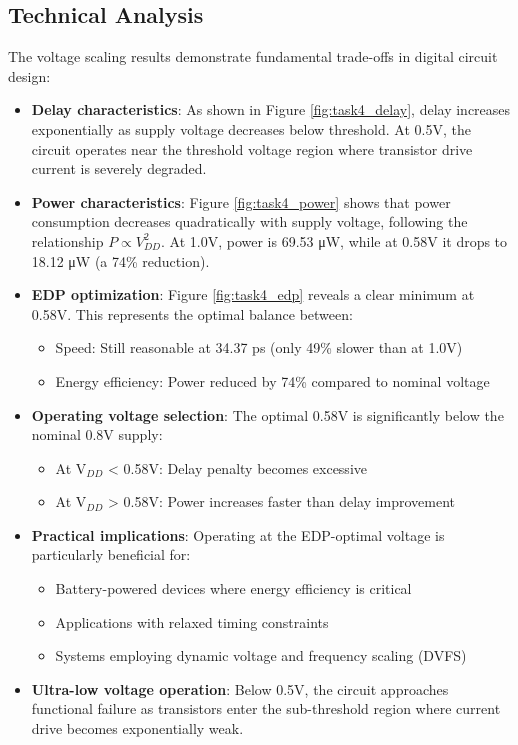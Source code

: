 \documentclass[UTF8,12pt,a4paper]{ctexart}
\begin{document}
\subsection{Technical Analysis}

The voltage scaling results demonstrate fundamental trade-offs in digital circuit design:

\begin{itemize}
    \item \textbf{Delay characteristics}: As shown in Figure \ref{fig:task4_delay}, delay increases exponentially as supply voltage decreases below threshold. At 0.5V, the circuit operates near the threshold voltage region where transistor drive current is severely degraded.
    
    \item \textbf{Power characteristics}: Figure \ref{fig:task4_power} shows that power consumption decreases quadratically with supply voltage, following the relationship $P \propto V_{DD}^2$. At 1.0V, power is 69.53 μW, while at 0.58V it drops to 18.12 μW (a 74\% reduction).
    
    \item \textbf{EDP optimization}: Figure \ref{fig:task4_edp} reveals a clear minimum at 0.58V. This represents the optimal balance between:
    \begin{itemize}
        \item Speed: Still reasonable at 34.37 ps (only 49\% slower than at 1.0V)
        \item Energy efficiency: Power reduced by 74\% compared to nominal voltage
    \end{itemize}
    
    \item \textbf{Operating voltage selection}: The optimal 0.58V is significantly below the nominal 0.8V supply:
    \begin{itemize}
        \item At V$_{DD}$ < 0.58V: Delay penalty becomes excessive
        \item At V$_{DD}$ > 0.58V: Power increases faster than delay improvement
    \end{itemize}
    
    \item \textbf{Practical implications}: Operating at the EDP-optimal voltage is particularly beneficial for:
    \begin{itemize}
        \item Battery-powered devices where energy efficiency is critical
        \item Applications with relaxed timing constraints
        \item Systems employing dynamic voltage and frequency scaling (DVFS)
    \end{itemize}
    
    \item \textbf{Ultra-low voltage operation}: Below 0.5V, the circuit approaches functional failure as transistors enter the sub-threshold region where current drive becomes exponentially weak.
\end{itemize}
\end{document}
